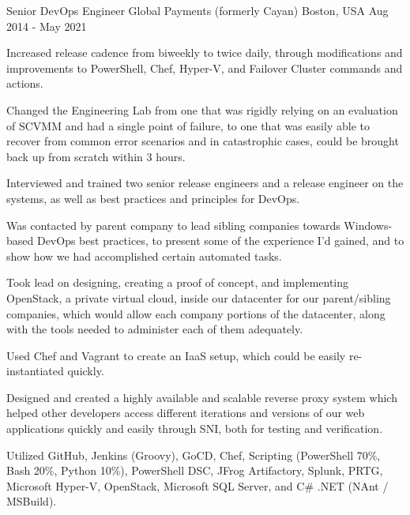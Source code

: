 \begin{cventries}
  \cventry
    {Senior DevOps Engineer} %
    {Global Payments (formerly Cayan)} %
    {Boston, USA} %
    {Aug 2014 - May 2021} %
    {
      \begin{cvitems} %
        \item {Increased release cadence from biweekly to twice daily, through modifications and improvements to PowerShell, Chef, Hyper-V, and Failover Cluster commands and actions.}
        \item {Changed the Engineering Lab from one that was rigidly relying on an evaluation of SCVMM and had a single point of failure, to one that was easily able to recover from common error scenarios and in catastrophic cases, could be brought back up from scratch within 3 hours.}
        \item {Interviewed and trained two senior release engineers and a release engineer on the systems, as well as best practices and principles for DevOps.}
        \item {Was contacted by parent company to lead sibling companies towards Windows-based DevOps best practices, to present some of the experience I'd gained, and to show how we had accomplished certain automated tasks.}
        \item {Took lead on designing, creating a proof of concept, and implementing OpenStack, a private virtual cloud, inside our datacenter for our parent/sibling companies, which would allow each company portions of the datacenter, along with the tools needed to administer each of them adequately.}
        \item {Used Chef and Vagrant to create an IaaS setup, which could be easily re-instantiated quickly.}
        \item {Designed and created a highly available and scalable reverse proxy system which helped other developers access different iterations and versions of our web applications quickly and easily through SNI, both for testing and verification.}
        \item {Utilized GitHub, Jenkins (Groovy), GoCD, Chef, Scripting (PowerShell 70\%, Bash 20\%, Python 10\%), PowerShell DSC, JFrog Artifactory, Splunk, PRTG, Microsoft Hyper-V, OpenStack, Microsoft SQL Server, and C\# .NET (NAnt / MSBuild).}
      \end{cvitems}
    }


\end{cventries}
